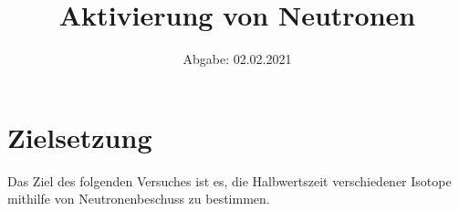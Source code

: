 

\subject{D703}
\title{Aktivierung von Neutronen}
\date{
    Abgabe: 02.02.2021
}



\maketitle
\thispagestyle{empty}
\tableofcontents
\newpage

\section{Zielsetzung}

    Das Ziel des folgenden Versuches ist es,
    die Halbwertszeit verschiedener Isotope mithilfe von Neutronenbeschuss zu bestimmen.


\newpage


\newpage


\newpage


\newpage

\printbibliography


    